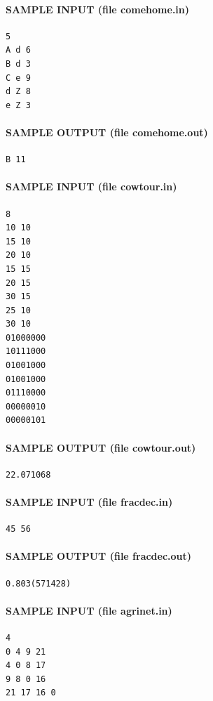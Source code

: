 \documentclass[11pt]{article}
\begin{document}
\paragraph{SAMPLE INPUT (file comehome.in)}
\begin{verbatim}
5
A d 6
B d 3
C e 9
d Z 8
e Z 3
\end{verbatim}

\paragraph{SAMPLE OUTPUT (file comehome.out)}
\begin{verbatim}
B 11
\end{verbatim}

\paragraph{SAMPLE INPUT (file cowtour.in)}
\begin{verbatim}
8
10 10
15 10
20 10
15 15
20 15
30 15
25 10
30 10
01000000
10111000
01001000
01001000
01110000
00000010
00000101
\end{verbatim}

\paragraph{SAMPLE OUTPUT (file cowtour.out)}
\begin{verbatim}
22.071068
\end{verbatim}

\paragraph{SAMPLE INPUT (file fracdec.in)}
\begin{verbatim}
45 56
\end{verbatim}

\paragraph{SAMPLE OUTPUT (file fracdec.out)}
\begin{verbatim}
0.803(571428)
\end{verbatim}

\paragraph{SAMPLE INPUT (file agrinet.in)}
\begin{verbatim}
4
0 4 9 21
4 0 8 17
9 8 0 16
21 17 16 0
\end{verbatim}
\end{document}
